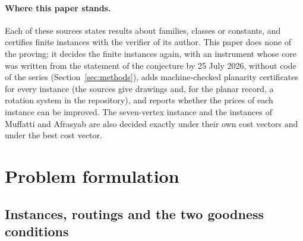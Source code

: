 \documentclass[11pt]{article}
\theoremstyle{remark}
\begin{document}
\paragraph{Where this paper stands.} Each of these sources states results about families, classes or constants, and
certifies finite instances with the verifier of its author. This paper does none of the proving; it decides the finite
instances again, with an instrument whose core was written from the statement of the conjecture by 25 July 2026, without code of the series (Section~\ref{sec:methods}),
adds machine-checked planarity certificates for every instance (the sources give drawings and, for the planar record, a rotation system in the repository), and reports whether the prices of each instance can be
improved. The seven-vertex instance and the instances of Muffatti and Afrasyab are also decided exactly under their
own cost vectors and under the best cost vector.

\section{Problem formulation}
\label{sec:problem}

\subsection{Instances, routings and the two goodness conditions}
\label{sec:instances}
\end{document}
